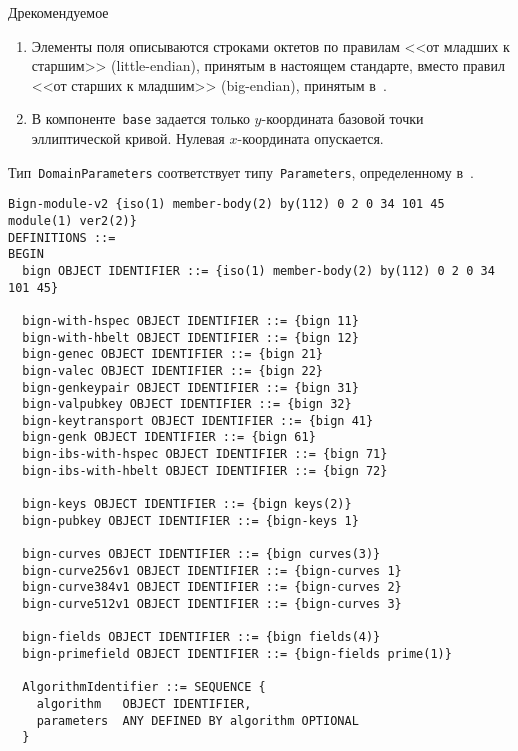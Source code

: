 \begin{appendix}{Д}{рекомендуемое}
\begin{enumerate}
\item
Элементы поля описываются строками октетов по правилам
<<от младших к старшим>> (little-endian), 
принятым в настоящем стандарте, 
вместо правил <<от старших к младшим>> (big-endian), 
принятым в~\cite{ANSI9.62}.

\item
В компоненте~\texttt{base} задается только $y$-координата
базовой точки эллиптической кривой. Нулевая $x$-координата опускается.
\end{enumerate}

Тип~\texttt{DomainParameters} соответствует типу~\texttt{Parameters}, 
определенному в~\cite{ANSI9.62}.



\label{ASN.Module}

\begin{verbatim}
Bign-module-v2 {iso(1) member-body(2) by(112) 0 2 0 34 101 45 module(1) ver2(2)}
DEFINITIONS ::=
BEGIN
  bign OBJECT IDENTIFIER ::= {iso(1) member-body(2) by(112) 0 2 0 34 101 45}
  
  bign-with-hspec OBJECT IDENTIFIER ::= {bign 11}
  bign-with-hbelt OBJECT IDENTIFIER ::= {bign 12}
  bign-genec OBJECT IDENTIFIER ::= {bign 21}
  bign-valec OBJECT IDENTIFIER ::= {bign 22}
  bign-genkeypair OBJECT IDENTIFIER ::= {bign 31}
  bign-valpubkey OBJECT IDENTIFIER ::= {bign 32}
  bign-keytransport OBJECT IDENTIFIER ::= {bign 41}
  bign-genk OBJECT IDENTIFIER ::= {bign 61}
  bign-ibs-with-hspec OBJECT IDENTIFIER ::= {bign 71}
  bign-ibs-with-hbelt OBJECT IDENTIFIER ::= {bign 72}

  bign-keys OBJECT IDENTIFIER ::= {bign keys(2)}
  bign-pubkey OBJECT IDENTIFIER ::= {bign-keys 1}

  bign-curves OBJECT IDENTIFIER ::= {bign curves(3)}
  bign-curve256v1 OBJECT IDENTIFIER ::= {bign-curves 1}
  bign-curve384v1 OBJECT IDENTIFIER ::= {bign-curves 2}
  bign-curve512v1 OBJECT IDENTIFIER ::= {bign-curves 3}

  bign-fields OBJECT IDENTIFIER ::= {bign fields(4)}
  bign-primefield OBJECT IDENTIFIER ::= {bign-fields prime(1)}

  AlgorithmIdentifier ::= SEQUENCE {
    algorithm   OBJECT IDENTIFIER,
    parameters  ANY DEFINED BY algorithm OPTIONAL
  }


\end{verbatim}
\end{appendix}
